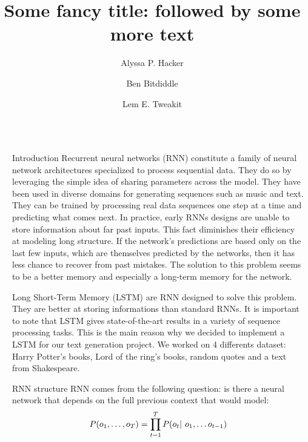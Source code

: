 \documentclass[final]{beamer}
\title{Some fancy title: followed by some more text}
\author{Alyssa P. Hacker \inst{1} \and Ben Bitdiddle \inst{2} \and Lem E. Tweakit \inst{2}}
\institute[shortinst]{\inst{1} Some Institute \samelineand \inst{2} Another Institute}
\newlength{\sepwidth}
\newlength{\colwidth}
\newcommand{\separatorcolumn}{\begin{column}{\sepwidth}\end{column}}
\begin{document}
\begin{frame}[t]
\begin{columns}[t]
\separatorcolumn

\begin{column}{\colwidth}

\begin{block}{Introduction}
Recurrent neural networks (RNN) constitute a family of neural network architectures
specialized to process sequential data. They do so by leveraging the simple idea
of sharing parameters across the model\cite{deeplearning}. They have been used in diverse domains for
generating sequences such as music and text. They can be trained by processing
real data sequences one step at a time and predicting what comes next.
In practice, early RNNs designs are unable to store information about far past
inputs. This fact diminishes their efficiency at modeling long structure. If
the network's predictions are based only on the last few inputs, which are
themselves predicted by the networks, then it has less chance to recover from
past mistakes. The solution to this problem seems to be a better memory and
especially a long-term memory for the network. 

Long Short-Term Memory (LSTM) are RNN designed to solve this problem. They are
better at storing informations than standard RNNs. It is important to note that
LSTM gives state-of-the-art results in a variety of sequence processing tasks.
This is the main reason why we decided to implement a LSTM for our text
generation project. We worked on 4 differents dataset: Harry Potter's books,
Lord of the ring's books, random quotes and a text from Shakespeare. 
\end{block}

\begin{block}{RNN structure} 
RNN comes from the following question: is there a neural network that depends
on the full previous context that would model: \begin{align*}
    P(o_1, \dots , o_T) = \prod_{t = 1}^T P(o_t | \hspace{0.05in} o_1, \ldots o_{t-1})
\end{align*}


\end{block}
\end{column}
\end{columns}
\end{frame}
\end{document}
